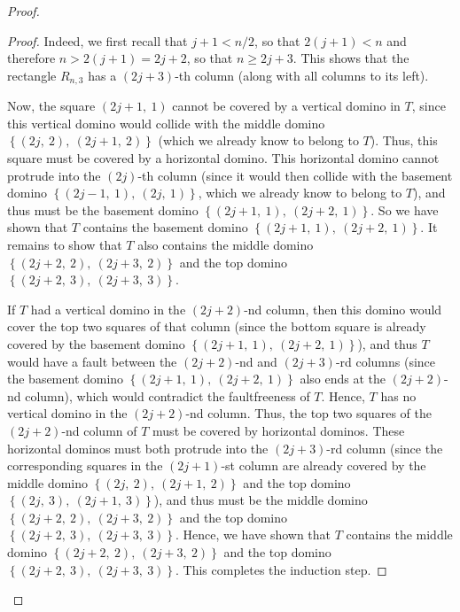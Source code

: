 \begin{fineprint}
\begin{proof}
\begin{proof}
Indeed, we first recall that $j+1<n/2$, so that $2\left(  j+1\right)  <n$ and
therefore $n>2\left(  j+1\right)  =2j+2$, so that $n\geq2j+3$. This shows that
the rectangle $R_{n,3}$ has a $\left(  2j+3\right)  $-th column (along with
all columns to its left).

Now, the square $\left(  2j+1,\ 1\right)  $ cannot be covered by a vertical
domino in $T$, since this vertical domino would collide with the middle domino
$\left\{  \left(  2j,\ 2\right)  ,\ \left(  2j+1,\ 2\right)  \right\}  $
(which we already know to belong to $T$). Thus, this square must be covered by
a horizontal domino. This horizontal domino cannot protrude into the $\left(
2j\right)  $-th column (since it would then collide with the basement domino
$\left\{  \left(  2j-1,\ 1\right)  ,\ \left(  2j,\ 1\right)  \right\}  $,
which we already know to belong to $T$), and thus must be the basement domino
$\left\{  \left(  2j+1,\ 1\right)  ,\ \left(  2j+2,\ 1\right)  \right\}  $. So
we have shown that $T$ contains the basement domino $\left\{  \left(
2j+1,\ 1\right)  ,\ \left(  2j+2,\ 1\right)  \right\}  $. It remains to show
that $T$ also contains the middle domino $\left\{  \left(  2j+2,\ 2\right)
,\ \left(  2j+3,\ 2\right)  \right\}  $ and the top domino $\left\{  \left(
2j+2,\ 3\right)  ,\ \left(  2j+3,\ 3\right)  \right\}  $.

If $T$ had a vertical domino in the $\left(  2j+2\right)  $-nd column, then
this domino would cover the top two squares of that column (since the bottom
square is already covered by the basement domino $\left\{  \left(
2j+1,\ 1\right)  ,\ \left(  2j+2,\ 1\right)  \right\}  $), and thus $T$ would
have a fault between the $\left(  2j+2\right)  $-nd and $\left(  2j+3\right)
$-rd columns (since the basement domino $\left\{  \left(  2j+1,\ 1\right)
,\ \left(  2j+2,\ 1\right)  \right\}  $ also ends at the $\left(  2j+2\right)
$-nd column), which would contradict the faultfreeness of $T$. Hence, $T$ has
no vertical domino in the $\left(  2j+2\right)  $-nd column. Thus, the top two
squares of the $\left(  2j+2\right)  $-nd column of $T$ must be covered by
horizontal dominos. These horizontal dominos must both protrude into the
$\left(  2j+3\right)  $-rd column (since the corresponding squares in the
$\left(  2j+1\right)  $-st column are already covered by the middle domino
$\left\{  \left(  2j,\ 2\right)  ,\ \left(  2j+1,\ 2\right)  \right\}  $ and
the top domino $\left\{  \left(  2j,\ 3\right)  ,\ \left(  2j+1,\ 3\right)
\right\}  $), and thus must be the middle domino $\left\{  \left(
2j+2,\ 2\right)  ,\ \left(  2j+3,\ 2\right)  \right\}  $ and the top domino
$\left\{  \left(  2j+2,\ 3\right)  ,\ \left(  2j+3,\ 3\right)  \right\}  $.
Hence, we have shown that $T$ contains the middle domino $\left\{  \left(
2j+2,\ 2\right)  ,\ \left(  2j+3,\ 2\right)  \right\}  $ and the top domino
$\left\{  \left(  2j+2,\ 3\right)  ,\ \left(  2j+3,\ 3\right)  \right\}  $.
This completes the induction step.


\end{proof}
\end{proof}
\end{fineprint}

